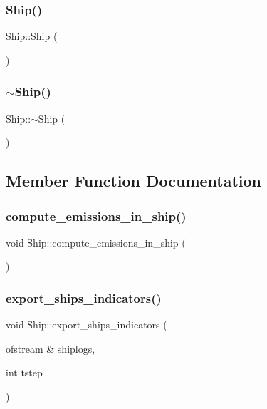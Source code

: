 \subsubsection{\texorpdfstring{Ship()}{Ship()}\hspace{0.1cm}{\footnotesize\ttfamily [2/2]}}
{\footnotesize\ttfamily Ship\+::\+Ship (\begin{DoxyParamCaption}{ }\end{DoxyParamCaption})}

\mbox{\label{class_ship_a43cd6eeaffc11b49239b091621963a65}} 
\subsubsection{\texorpdfstring{$\sim$Ship()}{~Ship()}}
{\footnotesize\ttfamily Ship\+::$\sim$\+Ship (\begin{DoxyParamCaption}{ }\end{DoxyParamCaption})}



\subsection{Member Function Documentation}
\mbox{\label{class_ship_a548c2595985e159dca37da2e1397972e}} 
\subsubsection{\texorpdfstring{compute\_emissions\_in\_ship()}{compute\_emissions\_in\_ship()}}
{\footnotesize\ttfamily void Ship\+::compute\+\_\+emissions\+\_\+in\+\_\+ship (\begin{DoxyParamCaption}{ }\end{DoxyParamCaption})}

\mbox{\label{class_ship_ae3b28abc6c66777fd31603bc737e5247}} 
\subsubsection{\texorpdfstring{export\_ships\_indicators()}{export\_ships\_indicators()}}
{\footnotesize\ttfamily void Ship\+::export\+\_\+ships\+\_\+indicators (\begin{DoxyParamCaption}\item[{ofstream \&}]{shiplogs,  }\item[{int}]{tstep }\end{DoxyParamCaption})}

